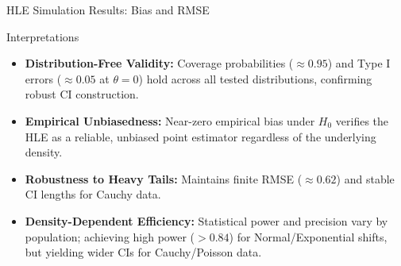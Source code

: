 \documentclass[8pt]{beamer}
\begin{document}
\begin{frame}{HLE Simulation Results: Bias and RMSE}
\begin{block}{\footnotesize Interpretations}
\begin{itemize}
        \item \textbf{Distribution-Free Validity:} Coverage probabilities ($\approx 0.95$) and Type I errors ($\approx 0.05$ at $\theta=0$) hold across all tested distributions, confirming robust CI construction.
        
        \item \textbf{Empirical Unbiasedness:} Near-zero empirical bias under $H_0$ verifies the HLE as a reliable, unbiased point estimator regardless of the underlying density.
        
        \item \textbf{Robustness to Heavy Tails:} Maintains finite RMSE ($\approx 0.62$) and stable CI lengths for Cauchy data.
        
        \item \textbf{Density-Dependent Efficiency:} Statistical power and precision vary by population; achieving high power ($>0.84$) for Normal/Exponential shifts, but yielding wider CIs for Cauchy/Poisson data.
    \end{itemize}
    \end{block}
\end{frame}
\end{document}
